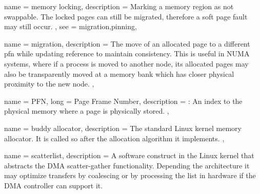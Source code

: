 {
	name = {memory locking},
	description = {
		Marking a memory region as not swappable. The locked pages can still be migrated, therefore
		a soft page fault may still occur.
	},
	see = {migration,pinning},
}

{
	name = {migration},
	description = {
		The move of an allocated page to a different \gls{pfn} while updating reference to maintain
		consistency. This is useful in NUMA systems, where if a process is moved to another node,
		its allocated pages may also be transparently moved at a memory bank
		which has closer physical proximity to the new node.
	},
}

{
	name = {PFN},
	long = {Page Frame Number},
	description = {\emph{}:
		An index to the physical memory where a page is physically stored.
	},
}

{
	name = {buddy allocator},
	description = {
		The standard Linux kernel memory allocator. It is called so after the allocation algorithm
		it implements.
	},
}

{
	name = {scatterlist},
	description = {
		A software construct in the Linux kernel that abstracts the DMA scatter-gather functionality.
		Depending the architecture it may optimize transfers by coalescing or by processing the list
		in hardware if the DMA controller can support it.
	}
}

